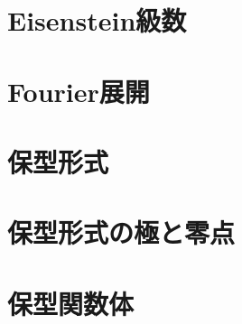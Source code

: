 \documentclass[uplatex, 12pt, dvipdfmx]{jsreport}
\begin{document}
\section{Eisenstein級数}

\section{Fourier展開}

\section{保型形式}

\section{保型形式の極と零点}

\section{保型関数体}
\end{document}
